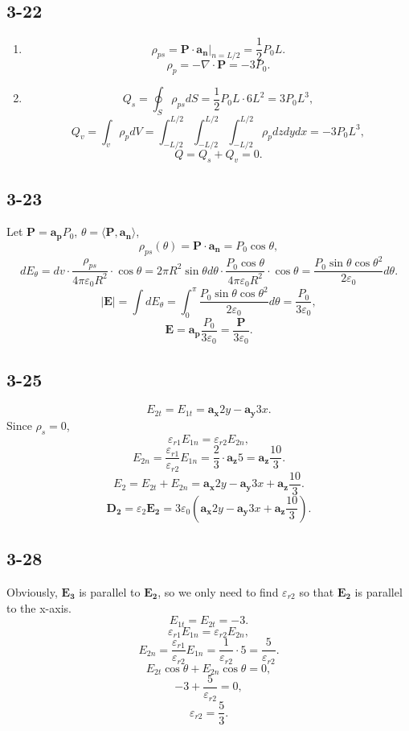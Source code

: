 \documentclass[6pt,a4paper]{article}
\begin{document}
\subsection{3-22}
\begin{enumerate}[label=\alph*)]
\item 
$$\rho_{ps}=\mathbf{P}\cdot\mathbf{a_n}|_{n=L/2}=\frac{1}{2}P_0L.$$
$$\rho_p=-\nabla\cdot\mathbf{P}=-3P_0.$$
\item
$$Q_s=\oint_S\rho_{ps}dS=\frac{1}{2}P_0L\cdot 6L^2=3P_0L^3,$$
$$Q_v=\int_v\rho_pdV=\int_{-L/2}^{L/2}\int_{-L/2}^{L/2}\int_{-L/2}^{L/2}\rho_pdzdydx=-3P_0L^3,$$
$$Q=Q_s+Q_v=0.$$
\end{enumerate}

\subsection{3-23}
Let $\mathbf{P}=\mathbf{a_p}P_0$, $\theta=\langle \mathbf{P},\mathbf{a_n} \rangle$,
$$\rho_{ps}(\theta)=\mathbf{P}\cdot\mathbf{a_n}=P_0\cos\theta,$$
$$dE_\theta=dv\cdot\frac{\rho_{ps}}{4\pi\varepsilon_0R^2}\cdot\cos\theta=2\pi R^2\sin\theta d\theta\cdot\frac{P_0\cos\theta}{4\pi\varepsilon_0R^2}\cdot\cos\theta=\frac{P_0\sin\theta\cos\theta^2}{2\varepsilon_0}d\theta.$$
$$|\mathbf{E}|=\int dE_\theta=\int_0^\pi\frac{P_0\sin\theta\cos\theta^2}{2\varepsilon_0}d\theta=\frac{P_0}{3\varepsilon_0},$$
$$\mathbf{E}=\mathbf{a_p}\frac{P_0}{3\varepsilon_0}=\frac{\mathbf{P}}{3\varepsilon_0}.$$

\subsection{3-25}
$$E_{2t}=E_{1t}=\mathbf{a_x}2y-\mathbf{a_y}3x.$$
Since $\rho_s=0$,
$$\varepsilon_{r1}E_{1n}=\varepsilon_{r2}E_{2n},$$
$$E_{2n}=\frac{\varepsilon_{r1}}{\varepsilon_{r2}}E_{1n}=\frac{2}{3}\cdot\mathbf{a_z}5=\mathbf{a_z}\frac{10}{3}.$$
$$E_2=E_{2t}+E_{2n}=\mathbf{a_x}2y-\mathbf{a_y}3x+\mathbf{a_z}\frac{10}{3}.$$
$$\mathbf{D_2}=\varepsilon_2\mathbf{E_2}=3\varepsilon_0\left(\mathbf{a_x}2y-\mathbf{a_y}3x+\mathbf{a_z}\frac{10}{3}\right).$$

\subsection{3-28}
Obviously, $\mathbf{E_3}$ is parallel to $\mathbf{E_2}$, so we only need to find $\varepsilon_{r2}$ so that $\mathbf{E_2}$ is parallel to  the x-axis.
$$E_{1t}=E_{2t}=-3.$$
$$\varepsilon_{r1}E_{1n}=\varepsilon_{r2}E_{2n},$$
$$E_{2n}=\frac{\varepsilon_{r1}}{\varepsilon_{r2}}E_{1n}=\frac{1}{\varepsilon_{r2}}\cdot5=\frac{5}{\varepsilon_{r2}}.$$
$$E_{2t}\cos\theta+E_{2n}\cos\theta=0,$$
$$-3+\frac{5}{\varepsilon_{r2}}=0,$$
$$\varepsilon_{r2}=\frac{5}{3}.$$
\end{document}
